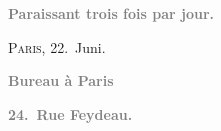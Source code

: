 \pstart
           \begin{otherlanguage}{french}\textcolor{gray}{\textbf{\textbf{Paraissant trois fois par jour.}}}\end{otherlanguage}\hfill \textsc{Paris}, 22. Juni.\pend
           
\pstart
           \begin{otherlanguage}{french}\textcolor{gray}{\textbf{\textbf{Bureau à Paris}}}\end{otherlanguage}\pend
           
\pstart
           \begin{otherlanguage}{french}\textcolor{gray}{\textbf{\textbf{24. Rue Feydeau.}}}\end{otherlanguage}\pend
           

